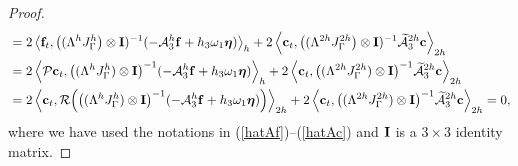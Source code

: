 \begin{proof}
\begin{align*}
& = 2\left<{\bf f}_t,\big(({\Lambda}^{h}{J}^h_\Gamma\big)\otimes {\bf I})^{-1}(-\mathcal{A}_3^h{\bf f}+h_3\omega_1{\bm \eta})\right>_{h}+ 2\left<{\bf c}_t,\big(({\Lambda}^{2h}{J}^{2h}_\Gamma\big)\otimes{\bf I})^{-1}\widetilde{\mathcal{A}}_3^{2h}{\bf c}\right>_{2h} \nonumber\\
& = 2\left<{\mathcal{P}}{\bf c}_t,\big(({\Lambda}^{h}{J}^h_\Gamma)\otimes{\bf I}\big)^{-1}(-\mathcal{A}_3^h{\bf f}+h_3\omega_1{\bm \eta})\right>_{h}+ 2\left<{\bf c}_t, \big(({\Lambda}^{2h}{J}^{2h}_\Gamma)\otimes{\bf I}\big)^{-1}\widetilde{\mathcal{A}}_3^{2h}{\bf c}\right>_{2h} \nonumber\\
& = 2\left<{\bf c}_t,{\mathcal{R}}\Big(\big(({\Lambda}^{h}{J}^h_\Gamma)\otimes{\bf I}\big)^{-1}(-\mathcal{A}_3^h{\bf f}+h_3\omega_1{\bm \eta})\Big)\right>_{2h}+ 2\left<{\bf c}_t,\big(({\Lambda}^{2h}{J}^{2h}_\Gamma)\otimes{\bf I}\big)^{-1}\widetilde{\mathcal{A}}_3^{2h}{\bf c}\right>_{2h} = 0,
\end{align*}
where we have used the notations in (\ref{hatAf})--(\ref{hatAc}) and ${\bf I}$ is a $3\times3$ identity matrix.
\end{proof}